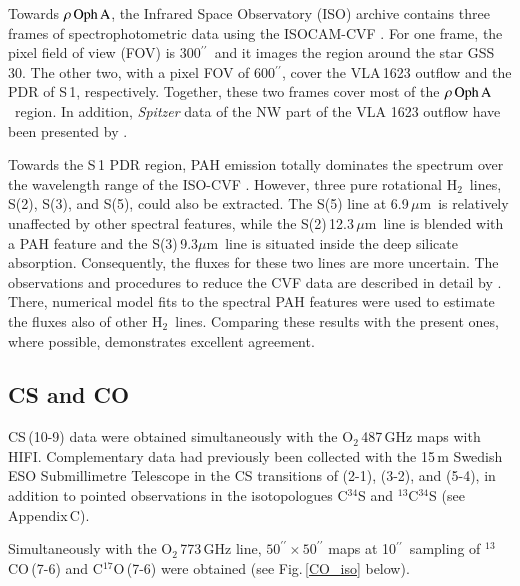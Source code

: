 \documentclass{aa}
\newcommand{\um}{$\mu$m}                                 %
\newcommand{\molh}{H$_{2}$}                              %
\newcommand{\molo}{O$_{2}$}                     %
\newcommand{\roa}{$\rho \, {\rm Oph \, A}$}
\newcommand{\asec}{$^{\prime \prime}$}
\begin{document}
Towards  \roa, the Infrared Space Observatory (ISO) archive contains three frames of spectrophotometric data using the ISOCAM-CVF \citep[Circular Variable Filter,][]{cesarsky1996}. For one frame, the pixel field of view (FOV) is 300\asec\ and it images the region around the star GSS\,30. The other two, with a pixel FOV of 600\asec, cover the VLA\,1623 outflow \citep{liseau2009} and the PDR of S\,1, respectively. Together, these two frames cover most of the \roa\  region. In addition, {\it Spitzer} data of the NW part of the VLA 1623 outflow have been presented by \citet{neufeld2009}.

Towards the S\,1 PDR region, PAH emission totally dominates the spectrum over the wavelength range of the ISO-CVF \citep[see also][]{justtanont2008}. However, three pure rotational \molh\ lines,   S(2), S(3), and S(5),  could also be extracted. The S(5) line at 6.9\,\um\ is relatively unaffected by other spectral features, while the S(2)\,12.3\,\um\ line is blended with a PAH feature and the S(3)\,9.3\um\ line is situated inside the deep silicate absorption. Consequently, the fluxes for these two lines are more uncertain. The observations and procedures to reduce the CVF data are described in detail by \citet{liseau2009}. There, numerical model fits to the spectral PAH features were used to estimate the fluxes also of other \molh\ lines. Comparing these results with the present ones, where possible, demonstrates excellent agreement.

\subsection{CS and CO}

CS\,(10-9) data were obtained simultaneously  with the \molo\,487\,GHz maps with HIFI. Complementary data had previously been collected with the 15\,m Swedish ESO Submillimetre Telescope \citep[SEST,][]{booth1989} in the CS transitions of (2-1), (3-2), and (5-4), in addition to pointed observations in the isotopologues C$^{34}$S and $^{13}$C$^{34}$S (see Appendix\,C). 

Simultaneously with the \molo\,773\,GHz line, $50^{\prime \prime} \times 50^{\prime \prime}$ maps at 10\asec\ sampling of  $^{13}$CO\,(7-6) and C$^{17}$O\,(7-6) were obtained (see Fig.\,\ref{CO_iso} below).
\end{document}
